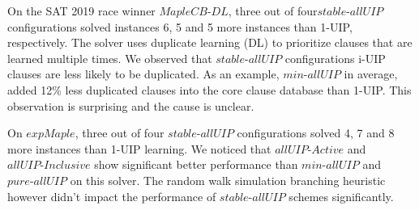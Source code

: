 \documentclass[runningheads]{llncs}
\newcommand{\allUip}{\textit{stable-allUIP}}
\newcommand{\allUipPure}{\textit{pure-allUIP}\xspace}
\newcommand{\allUipMin}{\textit{min-allUIP}\xspace}
\newcommand{\allUipAct}{\textit{allUIP-Active}}
\newcommand{\allUipIn}{\textit{allUIP-Inclusive}}
\newcommand{\MapleNineShort}{\textit{MapleCB-DL} }
\newcommand{\expSATShort}{\textit{expMaple} }
\begin{document}
On the SAT 2019 race winner $\MapleNineShort$,  three out of four$\allUip$ configurations solved instances 6, 5 and 5 more instances than 1-UIP, respectively. The solver uses duplicate learning (DL) to prioritize clauses that are learned multiple times. We observed that $\allUip$ configurations
i-UIP clauses are less likely to be duplicated. As an example, $\allUipMin$ in average, added 12\% less duplicated clauses into the
core clause database than 1-UIP. This observation is surprising and the cause is unclear.  


On $\expSATShort$,
three out of four $\allUip$ configurations solved 4, 7 and 8 more instances
than 1-UIP learning. We noticed that $\allUipAct$ and $\allUipIn$ show significant better performance than $\allUipMin$ and $\allUipPure$ on this solver. The random walk simulation branching heuristic however didn't impact the performance of $\allUip$ schemes significantly. 

{}

\end{document}
